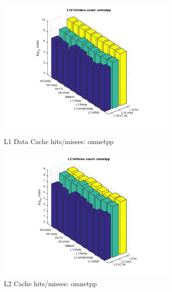 \documentclass[11pt,titlepage]{article}
\begin{document}
          \begin{figure}[H]
          \centering
          \begin{minipage}{.45\textwidth}
            \includegraphics[width=9cm]{L1DHM_omnetpp}
            \caption{L1 Data Cache hits/misses: omnetpp}
            \label{fig:L1DHM_omnetpp}
          \end{minipage}
          \begin{minipage}{.45\textwidth}
            \centering
            \includegraphics[width=9cm]{L2HM_omnetpp}
            \caption{L2 Cache hits/misses: omnetpp}
            \label{fig:L2HM_omnetpp}
          \end{minipage}
	\end{figure}
    
\end{document}
